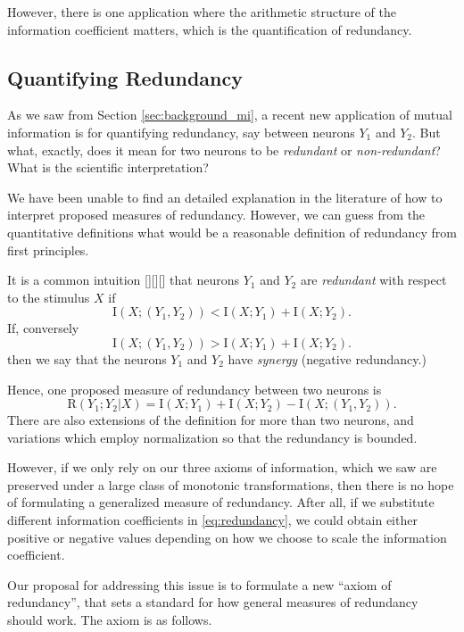 \documentclass[12pt]{article}
\begin{document}
However, there is one application where the arithmetic structure of
the information coefficient matters, which is the quantification of
redundancy.

\subsection{Quantifying Redundancy}\label{sec:redundancy}

As we saw from Section \ref{sec:background_mi}, a recent new
application of mutual information is for quantifying redundancy, say
between neurons $Y_1$ and $Y_2$.  But what, exactly, does it mean for
two neurons to be \emph{redundant} or \emph{non-redundant}?  What is
the scientific interpretation?

We have been unable to find an detailed explanation in the literature
of how to interpret proposed measures of redundancy.  However, we can
guess from the quantitative definitions what would be a reasonable
definition of redundancy from first principles.

It is a common intuition [][][] that neurons $Y_1$ and $Y_2$
are \emph{redundant} with respect to the stimulus $X$ if
\[
\text{I}(X; (Y_1, Y_2)) < \text{I}(X; Y_1) + \text{I}(X; Y_2).
\]
If, conversely
\[
\text{I}(X; (Y_1, Y_2)) > \text{I}(X; Y_1) + \text{I}(X; Y_2).
\]
then we say that the neurons $Y_1$ and $Y_2$ have \emph{synergy}
(negative redundancy.)

Hence, one proposed measure of redundancy between two neurons is
\begin{equation}\label{eq:redundancy}
\text{R}(Y_1;Y_2|X) = \text{I}(X; Y_1) + \text{I}(X; Y_2) - \text{I}(X; (Y_1, Y_2)).
\end{equation}
There are also extensions of the definition for more than two neurons,
and variations which employ normalization so that the redundancy is
bounded.

However, if we only rely on our three axioms of information, which we
saw are preserved under a large class of monotonic transformations,
then there is no hope of formulating a generalized measure of
redundancy.  After all, if we substitute different information
coefficients in \ref{eq:redundancy}, we could obtain either positive
or negative values depending on how we choose to scale the information
coefficient.

Our proposal for addressing this issue is to formulate a new ``axiom
of redundancy'', that sets a standard for how general measures of
redundancy should work.  The axiom is as follows.
\end{document}

